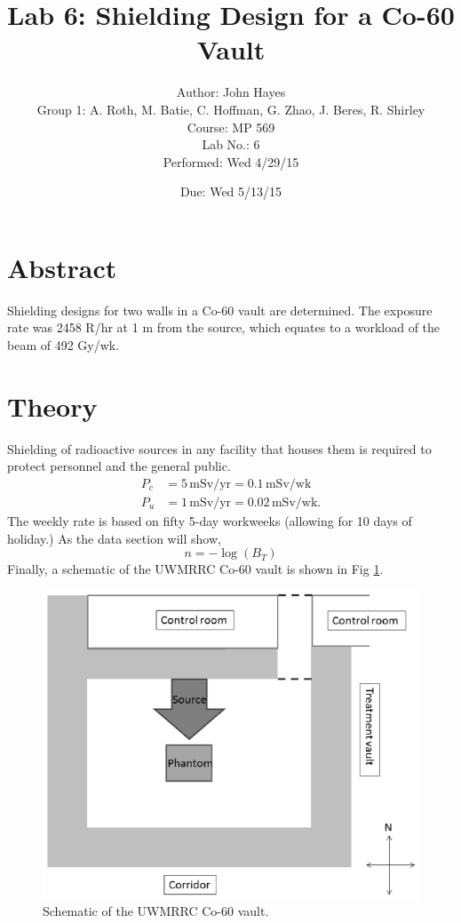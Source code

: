 \documentclass[11pt, oneside]{article}   	%
\title{Lab 6: Shielding Design for a Co-60 Vault \\ }
\author{Author: John Hayes \\ Group 1: A. Roth, M. Batie, C. Hoffman, G. Zhao, J. Beres, R. Shirley \\ Course: MP 569 \\ Lab No.: 6 \\ Performed: Wed 4/29/15 }
\date{Due: Wed 5/13/15}							%
\begin{document}
\maketitle
\doublespacing
%
\section{Abstract} 

Shielding designs for two walls in a Co-60 vault are determined.  The exposure rate was 2458 R/hr at 1 m from the source, which equates to a workload of the beam of 492 Gy/wk.  

\clearpage
\section{Theory}

Shielding of radioactive sources in any facility that houses them is required to protect personnel and the general public.  
%
\begin{subequations} \label{eqn:Pvalues}
\begin{align} 
P_c &= 5 \, \text{mSv/yr} = 0.1 \, \text{mSv/wk}  \\
P_u &= 1 \, \text{mSv/yr} = 0.02 \, \text{mSv/wk}.
\end{align} 
\end{subequations}
%
The weekly rate is based on fifty 5-day workweeks (allowing for 10 days of holiday.)    As the data section will show, 
%
\begin{equation} \label{eqn:numTVL}
n = -\log(B_T)
\end{equation}
%
Finally, a schematic of the UWMRRC Co-60 vault is shown in Fig \ref{fig:UWMRRC}. 
%
\begin{figure}[h]
    \centering
    \includegraphics[scale=0.6]{UWMRRC.png}
        \caption{Schematic of the UWMRRC Co-60 vault.}
    \label{fig:UWMRRC}
\end{figure}
\end{document}
